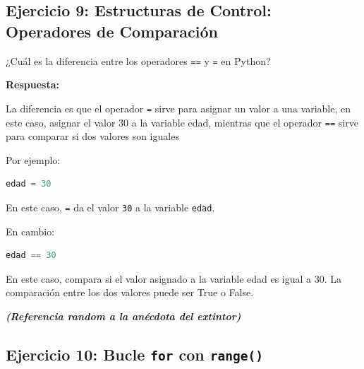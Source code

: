 \documentclass[12pt]{article}
\newcommand{\respuesta}{
    \vspace{0.3cm}
    \noindent\textbf{Respuesta:}
    \vspace{0.2cm}
}
\begin{document}
\subsection*{Ejercicio 9: Estructuras de Control: Operadores de Comparación}

¿Cuál es la diferencia entre los operadores \texttt{==} y \texttt{=} en Python?

\respuesta

La diferencia es que el operador \texttt{=} sirve para asignar un valor a una variable, en este caso, asignar el valor 30 a la variable edad, mientras que el operador \texttt{==} sirve para comparar si dos valores son iguales

Por ejemplo:

\begin{lstlisting}[language=Python]
edad = 30
\end{lstlisting}

En este caso, \texttt{=} da el valor \texttt{30} a la variable \texttt{edad}.

En cambio:

\begin{lstlisting}[language=Python]
edad == 30
\end{lstlisting}

En este caso, compara si el valor asignado a la variable edad es igual a 30. La comparación entre los dos valores puede ser True o False. \\

\faFireExtinguisher \quad
\faFireExtinguisher \quad
\faFireExtinguisher \quad
\faFireExtinguisher \quad
\faFireExtinguisher \quad
\faFireExtinguisher \quad
\faFireExtinguisher \quad
\faFireExtinguisher \quad
\faFireExtinguisher \quad
\faFireExtinguisher \quad
\faFireExtinguisher \quad
\faFireExtinguisher \quad
\faFireExtinguisher \quad
\faFireExtinguisher \quad
\faFireExtinguisher \quad
\faFireExtinguisher \quad
\faFireExtinguisher \quad
\faFireExtinguisher \quad
\faFireExtinguisher \quad
\faFireExtinguisher

\textbf{\textit{(Referencia random a la anécdota del extintor)}}


\subsection*{Ejercicio 10: Bucle \texttt{for} con \texttt{range()}}
\end{document}
